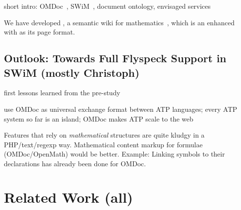 \documentclass{llncs}
\begin{document}
short intro: OMDoc~\cite{Kohlhase:omdoc1.2}, SWiM~\cite{Lange:swmkm-tr07}, document
ontology, envisaged services

We have developed {\swim}, a semantic wiki for mathematics~\cite{Lange:swmkm-tr07}, which
is an enhanced ~\cite{KrSchVr:semwiki-reasoning07} with {\omdoc} as its
page format.

\subsection{Outlook: Towards Full Flyspeck Support in SWiM (mostly Christoph)}
\label{sec:flyspeck-swim}

first lessons learned from the pre-study

use OMDoc as universal exchange format between ATP languages; every ATP system so far is
an island; OMDoc makes ATP scale to the web

Features that rely on \emph{mathematical} structures are quite kludgy in a PHP/text/regexp
way.  Mathematical content markup for formulae (OMDoc/OpenMath) would be better.  Example:
Linking symbols to their declarations has already been done for OMDoc.


\section{Related Work (all)}
\label{sec:related}

\end{document}
